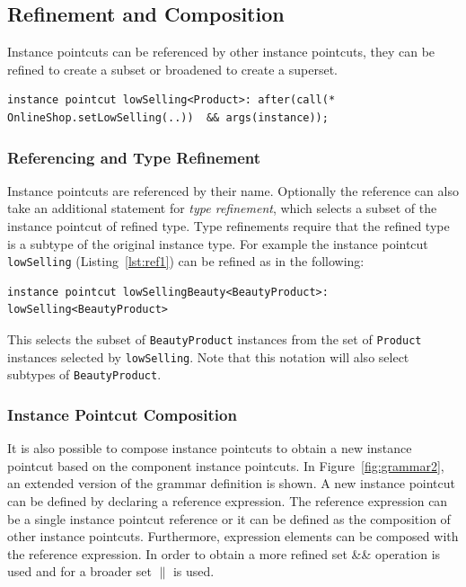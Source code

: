 \documentclass{acm_proc_article-sp}
\begin{document}
\subsection{Refinement and Composition}

Instance pointcuts can be referenced by other instance pointcuts, they can be refined to create a subset or broadened to create a superset. 

\begin{lstlisting}[float=h!, caption={An instance pointcut selecting low-selling products}, label={lst:ref1}]
instance pointcut lowSelling<Product>: after(call(* OnlineShop.setLowSelling(..))  && args(instance));
\end{lstlisting}

\subsubsection{Referencing and Type Refinement}
Instance pointcuts are referenced by their name. Optionally the reference can also take an additional statement for \emph{type refinement}, which selects a subset of the instance pointcut of refined type. Type refinements require that the refined type is a subtype of the original instance type. For example the instance pointcut \texttt{lowSelling} (Listing~\ref{lst:ref1}) can be refined as in the following:
\begin{lstlisting}[float=h!]
instance pointcut lowSellingBeauty<BeautyProduct>: lowSelling<BeautyProduct>
\end{lstlisting}

This selects the subset of \texttt{BeautyProduct} instances from the set of \texttt{Product} instances selected by \texttt{lowSelling}. 
Note that this notation will also select subtypes of \texttt{BeautyProduct}. 

\subsubsection{Instance Pointcut Composition}
It is also possible to compose instance pointcuts to obtain a new instance pointcut based on the component instance pointcuts. In Figure~\ref{fig:grammar2}, an extended version of the grammar definition is shown. A new instance pointcut can be defined by declaring a reference expression. The reference expression can be a single instance pointcut reference or it can be defined as the composition of other instance pointcuts.  Furthermore, expression elements can be composed with the reference expression. In order to obtain a more refined set \&\& operation is used and for a broader set $\|$ is used. 
\end{document}
